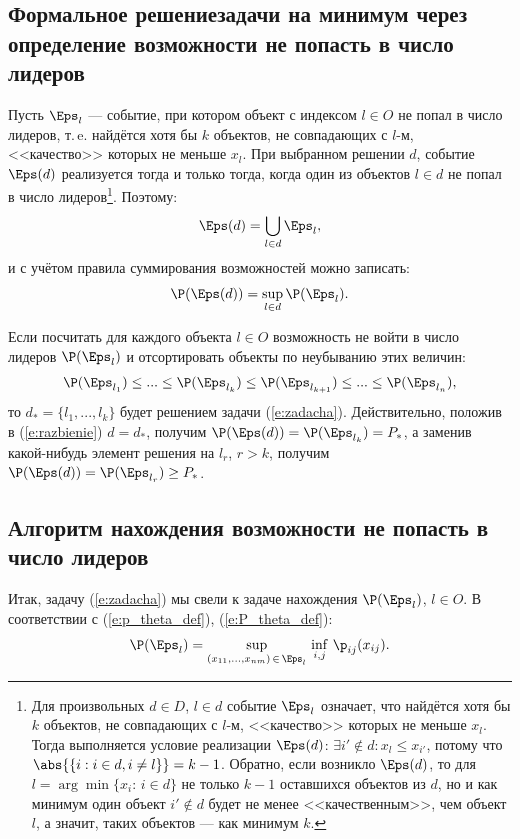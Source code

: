 \subsection{Формальное решениезадачи на минимум через определение возможности не попасть в число лидеров}

Пусть $\Eps_l$ --- событие, при котором объект с индексом $l \in O$ не попал в число лидеров, т.\,e. найдётся хотя бы $k$ объектов, не совпадающих с $l$-м, <<качество>> которых не меньше $x_l$. При выбранном решении $d$, событие $\Eps(d)$ реализуется тогда и только тогда, когда один из объектов $l \in d$ не попал в число   лидеров\footnote{Для произвольных $d \in D$, $l \in d$ событие $\Eps_l$ означает, что найдётся хотя бы $k$ объектов, не совпадающих с $l$-м, <<качество>> которых не меньше $x_l$. Тогда выполняется условие реализации $\Eps(d)$: $\exists i' \notin d: x_l \leq x_{i'}$, потому что $\abs{\{i: i \in d, i \neq l\}} = k-1$. Обратно, если возникло $\Eps(d)$, то для $l = \arg\min \{x_i:\,i \in d\}$ не только $k-1$ оставшихся объектов из $d$, но и как минимум один объект $i' \notin d$  будет не менее <<качественным>>, чем объект $l$, а значит, таких объектов --- как минимум $k$.}. Поэтому: 
\begin{equation*}
  \Eps(d) = \bigcup_{l \in d} \Eps_l,
\end{equation*}
и с учётом правила суммирования возможностей можно записать:
\begin{equation}
  \label{e:razbienie}
  \P(\Eps(d)) = \sup_{l \in d} \P(\Eps_l).
\end{equation}

Если посчитать для каждого объекта $l \in O$ возможность не войти в число лидеров $\P(\Eps_l)$ и отсортировать объекты по неубыванию этих величин:
\begin{equation}
  \label{e:left_order}
  \P(\Eps_{l_1}) \leq ... \leq \P(\Eps_{l_k}) \leq \P(\Eps_{l_{k+1}}) \leq ... \leq \P(\Eps_{l_n}), 
\end{equation}
то $d_* = \{l_1, ...,  l_k\}$ будет решением задачи (\ref{e:zadacha}). Действительно, положив в (\ref{e:razbienie}) $d = d_*$, получим $\P(\Eps(d)) = \P(\Eps_{l_k}) = P_*$, а заменив какой-нибудь элемент  решения на $l_r$, $r > k$, получим $\P(\Eps(d)) = \P(\Eps_{l_r}) \geq P_*$. 

\subsection{Алгоритм нахождения возможности не попасть в число лидеров}
 Итак, задачу (\ref{e:zadacha}) мы свели к задаче нахождения $\P(\Eps_l)$, $l \in O$. В соответствии с (\ref{e:p_theta_def}), (\ref{e:P_theta_def}):
\begin{equation}
  \label{e:pl_main}
  \P(\Eps_l) = \sup_{(x_{11}, ..., x_{nm})\,\in\,\Eps_l} \, \inf_{i, j}\,\p_{ij}(x_{ij}). 
\end{equation}

